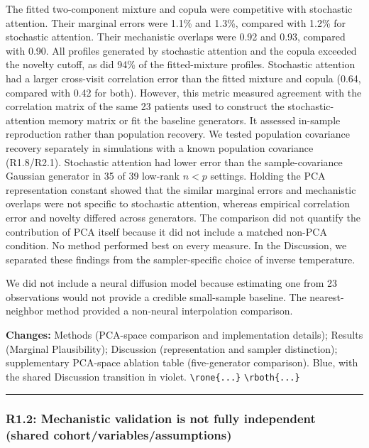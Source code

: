 \documentclass[
  11pt,
  letterpaper,
]{article}
\begin{document}
The fitted two-component mixture and copula were competitive with stochastic attention. Their marginal errors were 1.1\% and 1.3\%, compared with 1.2\% for stochastic attention. Their mechanistic overlaps were 0.92 and 0.93, compared with 0.90. All profiles generated by stochastic attention and the copula exceeded the novelty cutoff, as did 94\% of the fitted-mixture profiles. Stochastic attention had a larger cross-visit correlation error than the fitted mixture and copula (0.64, compared with 0.42 for both). However, this metric measured agreement with the correlation matrix of the same 23 patients used to construct the stochastic-attention memory matrix or fit the baseline generators. It assessed in-sample reproduction rather than population recovery. We tested population covariance recovery separately in simulations with a known population covariance (R1.8/R2.1). Stochastic attention had lower error than the sample-covariance Gaussian generator in 35 of 39 low-rank \(n<p\) settings. Holding the PCA representation constant showed that the similar marginal errors and mechanistic overlaps were not specific to stochastic attention, whereas empirical correlation error and novelty differed across generators. The comparison did not quantify the contribution of PCA itself because it did not include a matched non-PCA condition. No method performed best on every measure. In the Discussion, we separated these findings from the sampler-specific choice of inverse temperature.

We did not include a neural diffusion model because estimating one from 23 observations would not provide a credible small-sample baseline. The nearest-neighbor method provided a non-neural interpolation comparison.

\textbf{Changes:} Methods (PCA-space comparison and implementation details); Results (Marginal Plausibility); Discussion (representation and sampler distinction); supplementary PCA-space ablation table (five-generator comparison). Blue, with the shared Discussion transition in violet. \texttt{\textbackslash{}rone\{...\}} \texttt{\textbackslash{}rboth\{...\}}

\begin{center}\rule{0.5\linewidth}{0.5pt}\end{center}

\subsubsection{R1.2: Mechanistic validation is not fully independent (shared cohort/variables/assumptions)}\label{r12-mechanistic-validation-is-not-fully-independent-shared-cohortvariablesassumptions}
\end{document}
